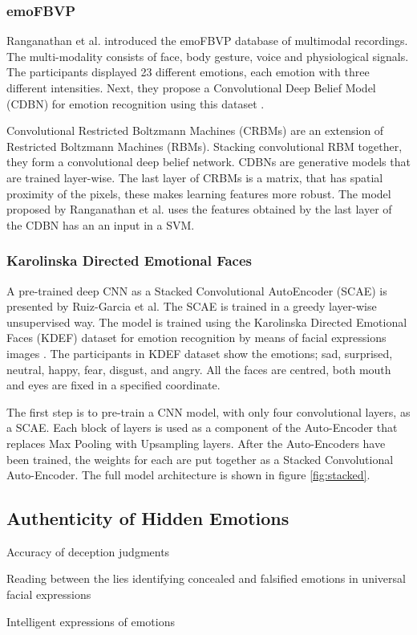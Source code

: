 \subsubsection{emoFBVP}
Ranganathan et al. introduced the emoFBVP database of multimodal recordings. The multi-modality consists of face, body gesture, voice and physiological signals. The participants displayed 23 different emotions, each emotion with three different intensities. Next, they propose a Convolutional Deep Belief Model (CDBN) for emotion recognition using this dataset \cite{RanganathanMultimodalArchitectures}.



Convolutional Restricted Boltzmann Machines (CRBMs) are an extension of Restricted Boltzmann Machines (RBMs). Stacking convolutional RBM together, they form a convolutional deep belief network. CDBNs are generative models that are trained layer-wise. The last layer of CRBMs is a matrix, that has spatial proximity of the pixels, these makes learning features more robust. The model proposed by Ranganathan et al. uses the features obtained by the last layer of the CDBN has an an input in a SVM.

\subsubsection{Karolinska Directed Emotional Faces}
A pre-trained deep CNN as a Stacked Convolutional AutoEncoder (SCAE) is presented by Ruiz-Garcia et al. The SCAE is trained in a greedy layer-wise unsupervised way. The model is trained using the Karolinska
Directed Emotional Faces (KDEF) dataset for emotion recognition by means of facial expressions images \cite{Ruiz-GarciaStackedExpressions}. The participants in KDEF dataset show the emotions; sad, surprised, neutral, happy, fear, disgust, and angry. All the faces are centred, both mouth and
eyes are fixed in a specified coordinate.



The first step is to pre-train a CNN model, with only four convolutional layers, as a SCAE. Each block of layers is used as a component of the Auto-Encoder that replaces Max Pooling with Upsampling layers. After the Auto-Encoders have been trained, the weights for each are put together as a Stacked Convolutional Auto-Encoder. The full model architecture is shown in figure \ref{fig:stacked}.



\subsection{Authenticity of Hidden Emotions}

Accuracy of deception judgments

Reading between the lies identifying concealed and falsified emotions in universal facial expressions

Intelligent expressions of emotions